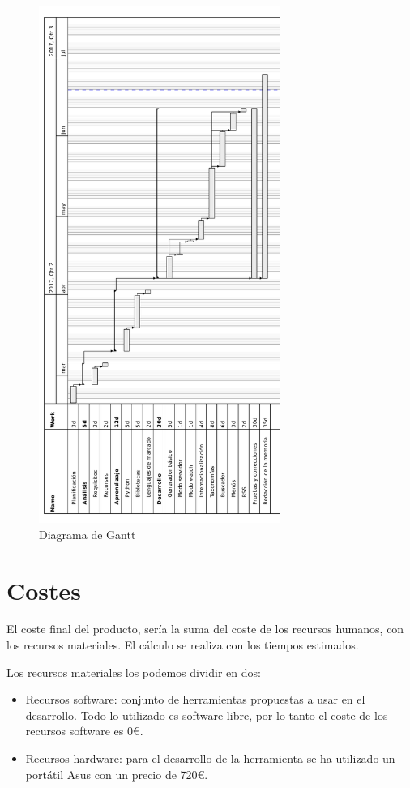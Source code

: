 \begin{figure}[htbp]
    \centering
    \includegraphics[width=0.7\textwidth]{2_calendario/diagrama_gantt}
    \caption{Diagrama de Gantt}
    \label{fig:gantt}
\end{figure}

\section{Costes}

El coste final del producto, sería la suma del coste de los recursos humanos, con los
recursos materiales. El cálculo se realiza con los tiempos estimados.

Los recursos materiales los podemos dividir en dos:

\begin{itemize}

    \item Recursos software: conjunto de herramientas propuestas a usar en el desarrollo. Todo lo
        utilizado es software libre, por lo tanto el coste de los recursos software es 0€.
    \item Recursos hardware: para el desarrollo de la herramienta se ha utilizado un portátil
        Asus con un precio de 720€.
\end{itemize}

